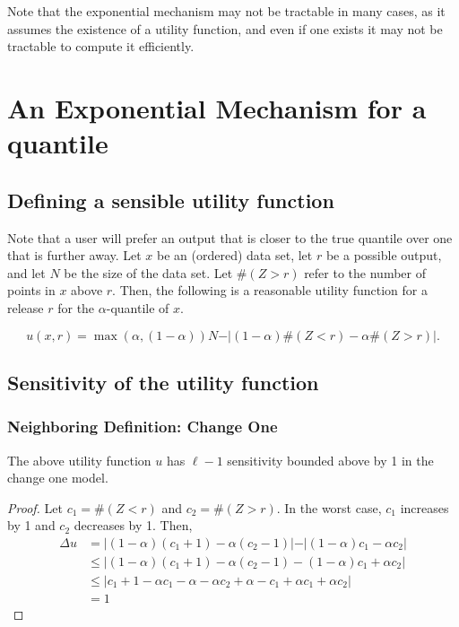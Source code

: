\documentclass[11pt]{scrartcl} %
\begin{document}
Note that the exponential mechanism may not be tractable in many cases, as it assumes the existence of a utility function, and even if one exists it may not be tractable to compute it efficiently. 

\section{An Exponential Mechanism for a quantile}

\subsection{Defining a sensible utility function}

Note that a user will prefer an output that is closer to the true quantile over one that is further away. Let $x$ be an (ordered) data set, let $r$ be a possible output, and let $N$ be the size of the data set. Let $\#(Z>r)$ refer to the number of points in $x$ above $r$. Then, the following is a reasonable utility function for a release $r$ for the $\alpha$-quantile of $x$.

\begin{equation}
u(x,r) = \max(\alpha, (1-\alpha))N - \vert (1-\alpha)\#(Z<r) - \alpha\#(Z>r)\vert.
\end{equation} 

\subsection{Sensitivity of the utility function}

\subsubsection{Neighboring Definition: Change One}
\begin{lemma}
The above utility function $u$ has $\ell-1$ sensitivity bounded above by 1 in the change one model.
\end{lemma}

\begin{proof}
Let $c_1 = \#(Z<r)$ and $c_2 = \#(Z>r)$. In the worst case, $c_1$ increases by 1 and $c_2$ decreases by 1.
Then, 
\begin{align*}
\Delta u &= \vert (1-\alpha) (c_1 + 1) - \alpha (c_2-1) \vert - \vert (1-\alpha) c_1 - \alpha c_2 \vert  \\
 &\le \vert (1-\alpha) (c_1 + 1) - \alpha (c_2-1) - (1-\alpha) c_1 + \alpha c_2 \vert\\
 & \le \vert c_1 + 1 - \alpha c_1 - \alpha - \alpha c_2 + \alpha - c_1 + \alpha c_1 + \alpha c_2 \vert\\
&= 1
\end{align*}
\end{proof}
\end{document}

